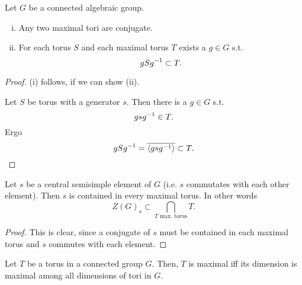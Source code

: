 \begin{corollary}
	Let $G$ be a connected algebraic group.
	\begin{enumerate}[(i)]
		\item Any two maximal tori are conjugate.
		\item For each torus $S$ and each maximal torus $T$ exists a $g \in G$ s.t.
		\[ gSg^{-1} \subset T. \]
	\end{enumerate}
\end{corollary}
\begin{proof}
	(i) follows, if we can show (ii).
	
	Let $S$ be torus with a generator $s$. Then there is a $g \in G$ s.t.
	\[ gsg^{-1} \in T. \]
	Ergo
	\[ gSg^{-1} = \overline{\left<gsg^{-1}\right>} \subset T. \]
\end{proof}

\begin{corollary}
	Let $s$ be a central semisimple element of $G$ (i.e. $s$ commutates with each other element). Then $s$ is contained in every maximal torus. In other words
	\[ Z(G)_s \subset \bigcap_{T \text{ max. torus}}T. \]
\end{corollary}
\begin{proof}
This is clear, since a conjugate of $s$ must be contained in each maximal torus and $s$ commutes with each element.
\end{proof}
\begin{corollary}
	Let $T$ be a torus in a connected group $G$.
	Then, $T$ is maximal iff its dimension is maximal among all dimensions of tori in $G$.
\end{corollary}